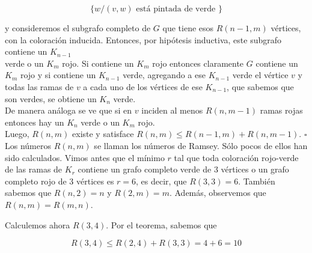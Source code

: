 \documentclass[10pt]{article}
\begin{document}
$$
\{w /(v, w) \text { está pintada de verde }\}
$$

y consideremos el subgrafo completo de $G$ que tiene esos $R(n-1, m)$ vértices, con la coloración inducida. Entonces, por hipótesis inductiva, este subgrafo contiene un $K_{n-1}$\\
verde o un $K_{m}$ rojo. Si contiene un $K_{m}$ rojo entonces claramente $G$ contiene un $K_{m}$ rojo y si contiene un $K_{n-1}$ verde, agregando a ese $K_{n-1}$ verde el vértice $v$ y todas las ramas de $v$ a cada uno de los vértices de ese $K_{n-1}$, que sabemos que son verdes, se obtiene un $K_{n}$ verde.\\
De manera análoga se ve que si en $v$ inciden al menos $R(n, m-1)$ ramas rojas entonces hay un $K_{n}$ verde o un $K_{m}$ rojo.\\
Luego, $R(n, m)$ existe y satisface $R(n, m) \leq R(n-1, m)+R(n, m-1)$. $\square$\\
Los números $R(n, m)$ se llaman los números de Ramsey. Sólo pocos de ellos han sido calculados. Vimos antes que el mínimo $r$ tal que toda coloración rojo-verde de las ramas de $K_{r}$ contiene un grafo completo verde de 3 vértices o un grafo completo rojo de 3 vértices es $r=6$, es decir, que $R(3,3)=6$. También sabemos que $R(n, 2)=n$ y $R(2, m)=m$. Además, observemos que $R(n, m)=R(m, n)$.

Calculemos ahora $R(3,4)$. Por el teorema, sabemos que

$$
R(3,4) \leq R(2,4)+R(3,3)=4+6=10
$$
\end{document}
